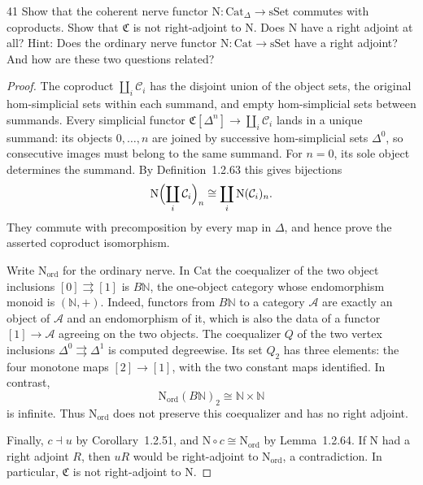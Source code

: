 \begin{exercise}{41}
Show that the coherent nerve functor $\mathrm{N}\colon\mathrm{Cat}_{\Delta}\to\mathrm{sSet}$ commutes with
coproducts. Show that $\mathfrak C$ is not right-adjoint to $\mathrm{N}$. Does $\mathrm{N}$ have a right adjoint at all? Hint:
Does the ordinary nerve functor $\mathrm{N}\colon\mathrm{Cat}\to\mathrm{sSet}$ have a right adjoint? And how are these two
questions related?

\begin{proof}
The coproduct $\coprod_i\mathcal C_i$ has the disjoint union
of the object sets, the original hom-simplicial sets within
each summand, and empty hom-simplicial sets between summands.
Every simplicial functor
$\mathfrak C[\Delta^n]\to\coprod_i\mathcal C_i$ lands in a
unique summand: its objects $0,\ldots,n$ are joined by
successive hom-simplicial sets $\Delta^0$, so consecutive
images must belong to the same summand.
For $n=0$, its sole object determines the summand.
By Definition~1.2.63 this gives bijections
\[
 \mathrm{N}\Bigl(\coprod_i\mathcal C_i\Bigr)_n
 \cong\coprod_i\mathrm{N}(\mathcal C_i)_n.
\]
They commute with precomposition by every map in $\Delta$,
and hence prove the asserted coproduct isomorphism.

Write $\mathrm{N}_{\mathrm{ord}}$ for the ordinary nerve.
In $\mathrm{Cat}$ the coequalizer of the two object inclusions
$[0]\rightrightarrows[1]$ is $B\mathbb N$, the one-object
category whose endomorphism monoid is $(\mathbb N,+)$.
Indeed, functors from $B\mathbb N$ to a category $\mathcal A$
are exactly an object of $\mathcal A$ and an endomorphism of it,
which is also the data of a functor $[1]\to\mathcal A$
agreeing on the two objects.
The coequalizer $Q$ of the two vertex inclusions
$\Delta^0\rightrightarrows\Delta^1$ is computed degreewise.
Its set $Q_2$ has three elements: the four monotone maps
$[2]\to[1]$, with the two constant maps identified.
In contrast,
\[
 \mathrm{N}_{\mathrm{ord}}(B\mathbb N)_2
 \cong\mathbb N\times\mathbb N
\]
is infinite. Thus $\mathrm{N}_{\mathrm{ord}}$ does not
preserve this coequalizer and has no right adjoint.

Finally, $c\dashv u$ by Corollary~1.2.51, and
$\mathrm{N}\circ c\cong\mathrm{N}_{\mathrm{ord}}$ by
Lemma~1.2.64. If $\mathrm{N}$ had a right adjoint $R$, then
$uR$ would be right-adjoint to $\mathrm{N}_{\mathrm{ord}}$,
a contradiction. In particular, $\mathfrak C$ is not
right-adjoint to $\mathrm{N}$.
\end{proof}
\end{exercise}
